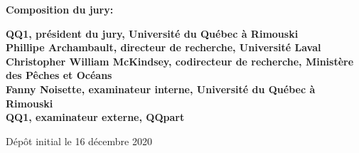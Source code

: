 \thispagestyle{empty}

\null
\vfill
\noindent \textbf{Composition du jury:}\\
\vspace{1cm}

\begin{singlespace}
  \noindent \textbf{QQ1, président du jury, Université du Québec à Rimouski}\\

  \noindent \textbf{Phillipe Archambault, directeur de recherche, Université Laval}\\

  \noindent \textbf{Christopher William McKindsey, codirecteur de recherche, Ministère des Pêches et Océans}\\

  \noindent \textbf{Fanny Noisette, examinateur interne, Université du Québec à Rimouski}\\

  \noindent \textbf{QQ1, examinateur externe, QQpart}\\
\end{singlespace}

\vspace{2cm}
\noindent Dépôt initial le 16 décembre 2020
\hspace{3cm}


\cleardoublepage
